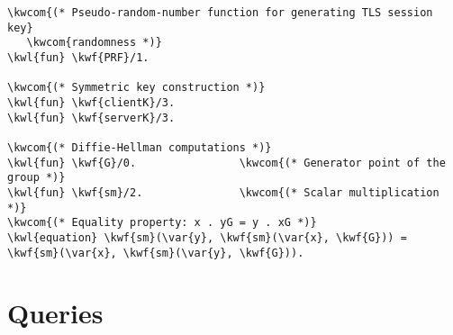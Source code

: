 \begin{Verbatim}[commandchars=\\\{\}]
\kwcom{(* Pseudo-random-number function for generating TLS session key}
   \kwcom{randomness *)}
\kwl{fun} \kwf{PRF}/1.

\kwcom{(* Symmetric key construction *)}
\kwl{fun} \kwf{clientK}/3.
\kwl{fun} \kwf{serverK}/3.

\kwcom{(* Diffie-Hellman computations *)}
\kwl{fun} \kwf{G}/0.                \kwcom{(* Generator point of the group *)}
\kwl{fun} \kwf{sm}/2.               \kwcom{(* Scalar multiplication *)}
\kwcom{(* Equality property: x . yG = y . xG *)}
\kwl{equation} \kwf{sm}(\var{y}, \kwf{sm}(\var{x}, \kwf{G})) = \kwf{sm}(\var{x}, \kwf{sm}(\var{y}, \kwf{G})).
\end{Verbatim}

\section{Queries}
